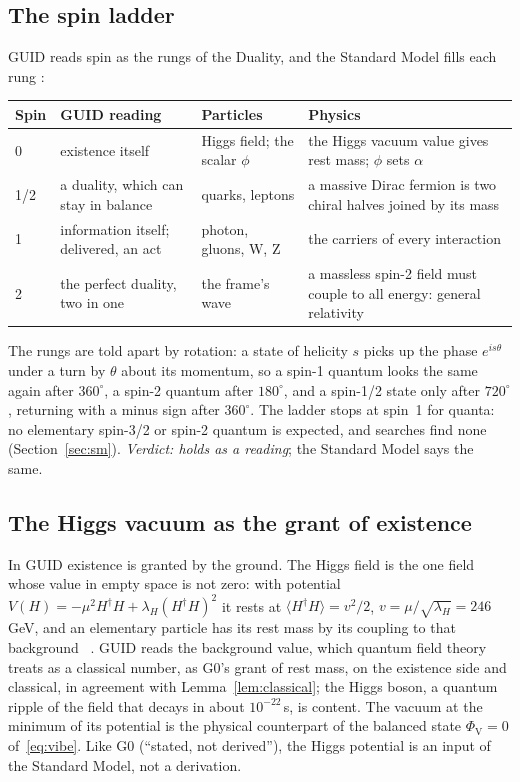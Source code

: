 
\subsection{The spin ladder}\label{sec:spin}

GUID reads spin as the rungs of the Duality, and the Standard Model fills each rung \tagP:

\begin{center}\small
\begin{tabularx}{\linewidth}{@{}lLLL@{}}
\toprule
Spin & GUID reading & Particles & Physics \\
 & existence itself & Higgs field; the scalar $\phi$ & the Higgs vacuum value gives rest mass; $\phi$ sets $\alpha$ \\
1/2 & a duality, which can stay in balance & quarks, leptons & a massive Dirac fermion is two chiral halves joined by its mass \\
1 & information itself; delivered, an act & photon, gluons, W, Z & the carriers of every interaction \\
2 & the perfect duality, two in one & the frame's wave & a massless spin-2 field must couple to all energy: general relativity~\cite{weinberg64,deser70} \\
\bottomrule
\end{tabularx}
\end{center}

\noindent The rungs are told apart by rotation: a state of helicity $s$ picks up the phase $e^{is\theta}$ under a turn by $\theta$ about its
momentum, so a spin-1 quantum looks the same again after $360^\circ$, a spin-2 quantum after $180^\circ$, and a spin-1/2 state only after
$720^\circ$, returning with a minus sign after $360^\circ$. The ladder stops at spin~1 for quanta: no elementary spin-3/2 or spin-2 quantum is expected, and searches find none
(Section~\ref{sec:sm}). \emph{Verdict: holds as a reading}; the Standard Model says the same.

\subsection{The Higgs vacuum as the grant of existence}\label{sec:grant}

In GUID existence is granted by the ground. The Higgs field is the one field whose value in empty space is not zero: with potential
$V(H)=-\mu^2H^\dagger H+\lambda_H(H^\dagger H)^2$ it rests at $\langle H^\dagger H\rangle=v^2/2$, $v=\mu/\sqrt{\lambda_H}=246$\,GeV, and an
elementary particle has its rest mass by its coupling to that background~\cite{higgs64,be64} \tagP. GUID reads the background value, which
quantum field theory treats as a classical number, as G0's grant of rest mass, on the existence side and classical, in agreement with
Lemma~\ref{lem:classical}; the Higgs boson, a quantum ripple of the field that decays in about $10^{-22}$\,s, is content. The vacuum at the
minimum of its potential is the physical counterpart of the balanced state $\Phi_{\mathrm V}=0$ of~\eqref{eq:vibe}. Like G0 (``stated, not
derived''), the Higgs potential is an input of the Standard Model, not a derivation.

